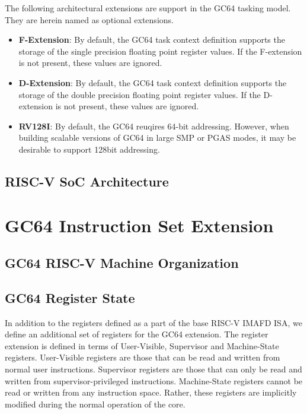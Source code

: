 \documentclass{article}
\begin{document}
The following architectural extensions are support in the GC64 tasking model.  They are herein named as optional extensions.  

\begin{itemize}
\item \textbf{F-Extension}:  By default, the GC64 task context definition supports the storage of the single precision floating point register values.  If the F-extension is not present, these values are ignored.  
\item \textbf{D-Extension}: By default, the GC64 task context definition supports the storage of the double precision floating point register values.  If the D-extension is not present, these values are ignored.  
\item \textbf{RV128I}: By default, the GC64 reuqires 64-bit addressing.  However, when building scalable versions of GC64 in large SMP or PGAS modes, it may be desirable to support 128bit addressing.  
\end{itemize}

\subsection{RISC-V SoC Architecture}

\section{GC64 Instruction Set Extension}

\subsection{GC64 RISC-V Machine Organization}
\subsection{GC64 Register State}
In addition to the registers defined as a part of the base RISC-V IMAFD ISA, we define an additional set of registers for the GC64 extension.  The register extension is defined in terms of User-Visible, Supervisor and Machine-State registers.  User-Visible registers are those that can be read and written from normal user instructions.  Supervisor registers are those that can only be read and written from supervisor-privileged instructions.  Machine-State registers cannot be read or written from any instruction space.  Rather, these registers are implicitly modified during the normal operation of the core.     
\end{document}
